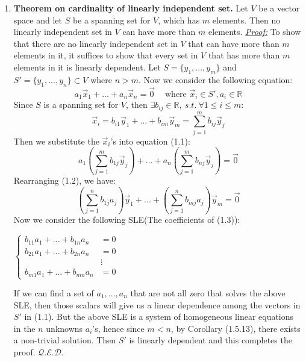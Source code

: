 \documentclass[oneside, 12pt]{book}
\newcommand{\settag}[1]{\renewcommand{\theenumi}{#1}}
\newcommand{\R}{\mathbb{R}}
\newcommand{\qed}{\hfill $\mathcal{Q}.\mathcal{E}.\mathcal{D}.$}
\newcommand{\tbf}[1]{\textbf{#1}}
\newcommand{\tit}[1]{\textit{#1}}
\begin{document}
\begin{enumerate}
        \settag{1.6.10}
        \item \tbf{Theorem on cardinality of linearly independent set.} Let $V$ be a vector space and let $S$ be a spanning set for $V$, which has $m$ elements. Then no linearly independent set in $V$ can have more than $m$ elements.\newline
        \tit{\underline{Proof:}}\newline
        To show that there are no linearly independent set in $V$ that can have more than $m$ elements in it, it suffices to show that every set in $V$ that has more than $m$ elements in it is linearly dependent. Let $S=\{y_1,...,y_m\}$ and $S'=\{y_1,...,y_n\}\subset V$ where $n>m$. Now we consider the following equation:
        \begin{equation}
            a_1\vec{x}_1 + ... + a_n\vec{x}_n = \vec{0}~~~~\text{    where }\vec{x}_i \in S',a_i\in \R
        \end{equation}
        Since $S$ is a spanning set for $V$, then $\exists b_{ij}\in \R,~s.t.~\forall 1\leq i \leq m$:
        \begin{equation*}
            \vec{x}_i = b_{i1}\vec{y}_1 + ... + b_{im}\vec{y}_m = \sum_{j=1}^{m}b_{ij}\vec{y}_j
        \end{equation*}
        Then we substitute the $\vec{x}_i$'s into equation (1.1):
        \begin{equation}
            a_1\left(\sum_{j=1}^{m}b_{1j}\vec{y}_j\right) + ... +  a_n\left(\sum_{j=1}^{m}b_{nj}\vec{y}_j\right) = \vec{0}
        \end{equation}
        Rearranging (1.2), we have:
        \begin{equation}
            \left(\sum_{j=1}^{n}b_{1j}a_{j}\right)\vec{y}_1 + ... +  \left(\sum_{j=1}^{n}b_{mj}a_{j}\right)\vec{y}_m = \vec{0}
        \end{equation}
        Now we consider the following SLE(The coefficients of (1.3)):
        \begin{center}
            $
            \begin{cases}
            b_{11}a_1 + ... + b_{1n}a_n &= 0 \\
            b_{21}a_1 + ... + b_{2n}a_n &= 0 \\
            &\vdots \\
            b_{m1}a_1 + ... + b_{mn}a_n &= 0
            \end{cases}
            $
        \end{center}
        If we can find a set of $a_1, ..., a_n$ that are not all zero that solves the above SLE, then those scalars will give us a linear dependence among the vectors in $S'$ in (1.1). But the above SLE is a system of homogeneous linear equations in the $n$ unknowns $a_i$'s, hence since $m < n$, by Corollary (1.5.13), there exists a non-trivial solution. Then $S'$ is linearly dependent and this completes the proof. \qed
        

\end{enumerate}
\end{document}
